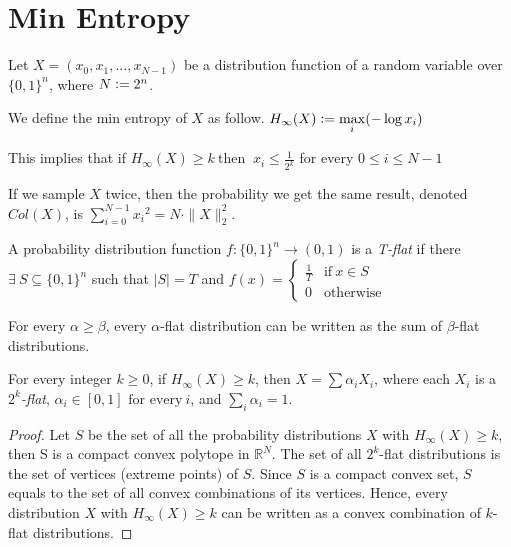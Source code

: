 \chapter{Min Entropy}
Let $X = (x_0, x_1, ..., x_{N-1})$ be a distribution function of a random variable over $\{ 0, 1 \}^n$, where $N \vcentcolon= 2^n$. 
\begin{definition}
We define the min entropy of $X$ as follow.\center
$H_\infty (X) \vcentcolon= \max\limits_{i} (- \log x_i)$
\end{definition}

This implies that if $H_\infty(X) \geq k \ \text{then } \ x_i \leq \frac{1}{2^k} $ for every $0 \leq i \leq N-1$

\begin{theorem}
If we sample $X$ twice, then the probability we get the same result, denoted $Col(X)$, is 
$\sum\limits_{i = 0}^{N-1} {x_i}^2 = N \cdot \| X \|_2^2$.
\end{theorem}

\begin{definition}
A probability distribution function $f \colon \{ 0, 1 \}^n \rightarrow (0,1)$ is a \textit{T-flat} if there $\exists \ S \subseteq \{ 0,1 \}^n$ such that $|S| = T$ and 
$f(x) = 
\begin{cases}
	\frac{1}{T} & \text{if} \ x \in S \\
	0             & \text{otherwise}
\end{cases}$
\end{definition}

\begin{lemma} For every $\alpha \geq \beta$, every $\alpha$-flat distribution can be written as the sum of $\beta$-flat distributions. 
\end{lemma}

\begin{theorem}
For every integer $k \geq 0$, if $H_\infty(X) \geq k$, then 
$X = \sum \alpha_i X_i$, where each $X_i$ is a \textit{$2^k$-flat}, $\alpha_i \in [0,1] \text{ for every} \ i$, and $\sum\limits_i \alpha_i = 1$.
\end{theorem}

\begin{proof}
Let $S$ be the set of all the probability distributions $X$ with $H_{\infty}(X) \geq k$, then S is a compact convex polytope in $\mathbb{R}^N$. The set of all $2^k$-flat distributions is the set of vertices (extreme points) of $S$. Since $S$ is a compact convex set, $S$ equals to the set of all convex combinations of its vertices. Hence, every distribution $X$ with  $H_{\infty}(X) \geq k$ can be written as a convex combination of $k$-flat distributions. 

\end{proof}

